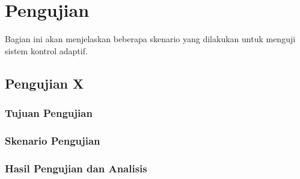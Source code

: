 \section{Pengujian}

Bagian ini akan menjelaskan beberapa skenario yang dilakukan untuk menguji sistem kontrol adaptif.

\subsection{Pengujian X}
\blindtext

\subsubsection{Tujuan Pengujian}
\blindtext

\subsubsection{Skenario Pengujian}
\blindtext

\subsubsection{Hasil Pengujian dan Analisis}
\blindtext